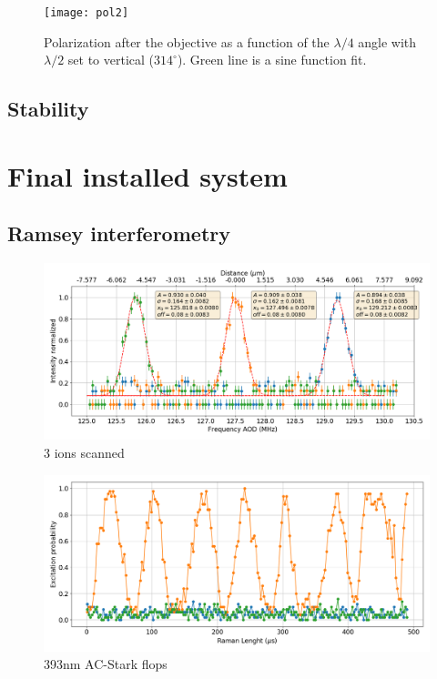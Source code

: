 \begin{figure}
\centering
\texttt{[image: pol2]}
\caption{Polarization after the objective as a function of the $\lambda/4$ angle with $\lambda/2$ set to vertical ($314^\circ$). Green line is a sine function fit.}
\label{pol2}
\end{figure}

\subsection{Stability}
\section{Final installed system}
\subsection{Ramsey interferometry}
\begin{figure}[H]
\centering
\includegraphics[width=\textwidth]{img/AODscan}
\caption{3 ions scanned}
\end{figure}
\begin{figure}[H]
\centering
\includegraphics[width=\textwidth]{img/ac_stark}
\caption{393nm AC-Stark flops}
\end{figure}

